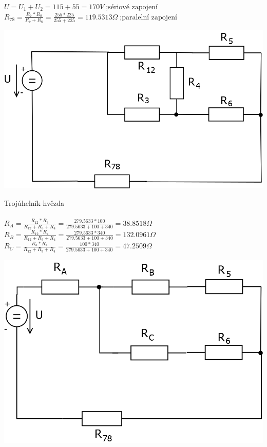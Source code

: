 \documentclass{article}
\begin{document}
\begin{large}
    $U=U_1+U_2=115+55=170V\;\text{;sériové zapojení}$\\

    $R_{78}=\frac{R_7*R_8}{R_7+R_8}=\frac{255*225}{255+225}=119.5313\Omega\;\text{;paralelní zapojení}$


\newpage

\begin{center}
    \includegraphics[scale=0.3]{Pr1/Pr1_2.png}
\end{center}


    Trojúhelník-hvězda\\~\\
    $R_A=\frac{R_{12}*R_3}{R_{12}+R_3+R_4}=\frac{279.5633*100}{279.5633+100+340}=38.8518\Omega$\\
    $R_B=\frac{R_{12}*R_4}{R_{12}+R_3+R_4}=\frac{279.5633*340}{279.5633+100+340}=132.0961\Omega$\\
    $R_C=\frac{R_3*R_4}{R_{12}+R_3+R_4}=\frac{100*340}{279.5633+100+340}=47.2509\Omega$


\begin{center}
    \includegraphics[scale=0.3]{Pr1/Pr1_3.png}
\end{center}



\end{large}
\end{document}

